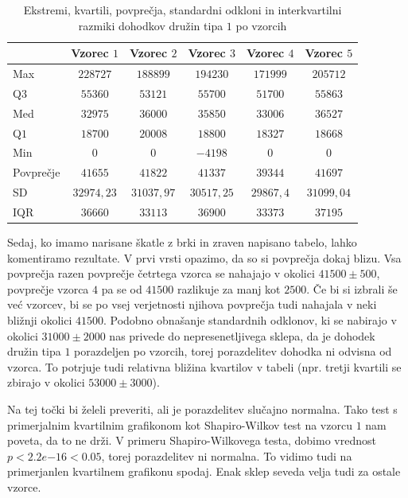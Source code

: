 \documentclass[a4paper, 10pt]{article}
\begin{document}
	\begin{table}[h!]
		\centering
		\begin{tabular}{|l|c|c|c|c|c|}
			\hline
			 & Vzorec $1$ & Vzorec $2$ & Vzorec $3$ & Vzorec $4$ & Vzorec $5$ \\ \hline
			Max & $228727$ & $188899$ & $194230$ & $171999$ & $205712$ \\ \hline
			Q$3$ & $55360$ & $53121$ & $55700$ & $51700$ & $55863$ \\ \hline
			Med & $32975$ & $36000$ & $35850$ & $33006$ & $36527$ \\ \hline
			Q$1$ & $18700$ & $20008$ & $18800$ & $18327$ & $18668$ \\ \hline
			Min & $0$ & $0$ & $-4198$ & $0$ & $0$ \\ \hline
			\hline
			Povprečje & $41655$ & $41822$ & $41337$ & $39344$ & $41697$ \\ \hline
			SD & $32974{,}23$ & $31037{,}97$ & $30517{,}25$ & $29867{,}4$ & $31099{,}04$ \\ \hline
			IQR & $36660$ & $33113$ & $36900$ & $33373$ & $37195$ \\ \hline
		\end{tabular}
		\caption{Ekstremi, kvartili, povprečja, standardni odkloni in interkvartilni razmiki dohodkov družin tipa $1$ po vzorcih}
	\end{table}
	
	Sedaj, ko imamo narisane škatle z brki in zraven napisano tabelo, lahko komentiramo rezultate. V prvi vrsti opazimo, da so si povprečja dokaj blizu. Vsa povprečja razen povprečje četrtega vzorca se nahajajo v okolici $41500 \pm 500$, povprečje vzorca $4$ pa se od $41500$ razlikuje za manj kot $2500$. Če bi si izbrali še već vzorcev, bi se po vsej verjetnosti njihova povprečja tudi nahajala v neki bližnji okolici $41500$. Podobno obnašanje standardnih odklonov, ki se nabirajo v okolici $31000 \pm 2000$ nas privede do nepresenetljivega sklepa, da je dohodek družin tipa $1$ porazdeljen po vzorcih, torej porazdelitev dohodka ni odvisna od vzorca. To potrjuje tudi relativna bližina kvartilov v tabeli (npr. tretji kvartili se zbirajo v okolici $53000 \pm 3000$).
	
	Na tej točki bi želeli preveriti, ali je porazdelitev slučajno normalna. Tako test s primerjalnim kvartilnim grafikonom kot Shapiro-Wilkov test na vzorcu $1$ nam poveta, da to ne drži. V primeru Shapiro-Wilkovega testa, dobimo vrednost $p < 2.2e{-16} < 0.05$, torej porazdelitev ni normalna. To vidimo tudi na primerjanlen kvartilnem grafikonu spodaj. Enak sklep seveda velja tudi za ostale vzorce.
	
\end{document}

